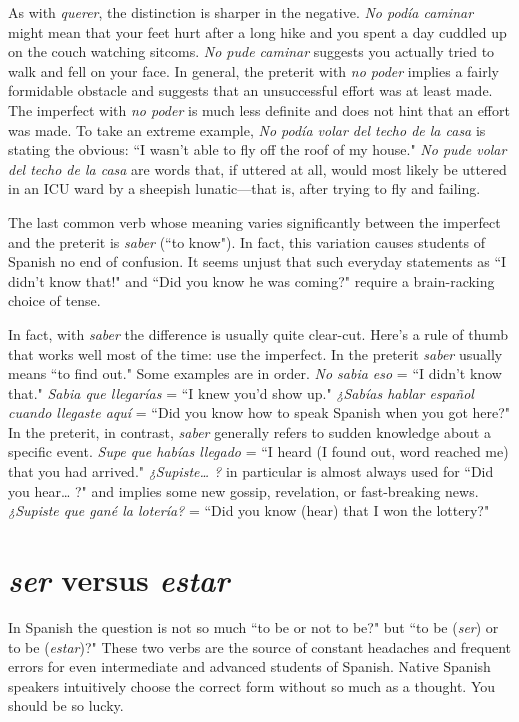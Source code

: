 As with \emph{querer}, the distinction is sharper in the negative. \emph{No
podía caminar} might mean that your feet hurt after a long hike and
you spent a day cuddled up on the couch watching sitcoms. \emph{No pude
caminar} suggests you actually tried to walk and fell on your face. In
general, the preterit with \emph{no poder} implies a fairly formidable obstacle
and suggests that an unsuccessful effort was at least made. The imperfect with \emph{no poder} is much less definite and does not hint that an effort was made. To take an extreme example, \emph{No podía volar del techo
de la casa} is stating the obvious: ``I wasn't able to fly off the roof of my
house." \emph{No pude volar del techo de la casa} are words that, if uttered
at all, would most likely be uttered in an ICU ward by a sheepish lunatic---that is, after trying to fly and failing.

The last common verb whose meaning varies significantly
between the imperfect and the preterit is \emph{saber} (``to know"). In fact, this
variation causes students of Spanish no end of confusion. It seems unjust that such everyday statements as ``I didn't know that!" and ``Did
you know he was coming?" require a brain-racking choice of tense.

In fact, with \emph{saber} the difference is usually quite clear-cut.
Here's a rule of thumb that works well most of the time: use the imperfect. In the preterit \emph{saber} usually means ``to find out." Some examples are in order. \emph{No sabia eso} = ``I didn't know that." \emph{Sabia que
llegarías} = ``I knew you'd show up." \emph{¿Sabías hablar español cuando
llegaste aquí} = ``Did you know how to speak Spanish when you got
here?" In the preterit, in contrast, \emph{saber} generally refers to sudden
knowledge about a specific event. \emph{Supe que habías llegado} = ``I heard
(I found out, word reached me) that you had arrived." \emph{¿Supiste\ldots{} ?} in
particular is almost always used for ``Did you hear\ldots{} ?" and implies
some new gossip, revelation, or fast-breaking news. \emph{¿Supiste que gané
la lotería?} = ``Did you know (hear) that I won the lottery?"

\section{\emph{ser} versus \emph{estar}}

In Spanish the question is not so much ``to be or not to be?"
but ``to be (\emph{ser}) or to be (\emph{estar})?" These two verbs are the source of
constant headaches and frequent errors for even intermediate and
advanced students of Spanish. Native Spanish speakers intuitively
choose the correct form without so much as a thought. You should
be so lucky.

